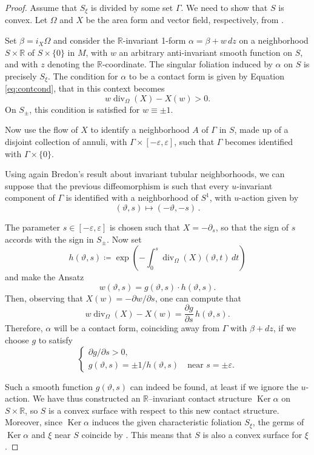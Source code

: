 \documentclass[a4paper, 11pt]{amsart}
\theoremstyle{plain}
\theoremstyle{definition}
\newcommand{\R}{\mathbb{R}}
\renewcommand{\epsilon}{\varepsilon}
\renewcommand{\theta}{\vartheta}
\DeclareMathOperator{\Ker}{Ker}
\DeclareMathOperator{\diver}{div}
\begin{document}
\begin{proof}
	Assume that $S_\xi$ is divided by some set $\Gamma$. We need to show that $S$ is convex. Let $\Omega$ and $X$ be the area form and vector field, respectively, from .
	
	Set $\beta = i_X\Omega$ and consider the $\R$-invariant 1-form $\alpha = \beta + w\,dz$ on a neighborhood $S \times \R$ of $S \times \{0\}$ in $M$, with $w$ an arbitrary anti-invariant smooth function on $S$, and with $z$ denoting the $\R$-coordinate. The singular foliation induced by $\alpha$ on $S$ is precisely $S_\xi$. The condition for $\alpha$ to be a contact form is given by Equation \eqref{eq:contcond}, that in this context becomes
	\[
	w \diver_\Omega(X) - X(w) > 0.
	\]
	On $S_\pm$, this condition is satisfied for $w \equiv \pm 1$.
	
	Now use the flow of $X$ to identify a neighborhood $A$ of $\Gamma$ in $S$, made up of a disjoint collection of annuli, with $\Gamma \times [-\epsilon, \epsilon]$, such that $\Gamma$ becomes identified with $\Gamma \times \{0\}$.
	
	Using again Bredon's result about invariant tubular neighborhoods, we can suppose that the previous diffeomorphism is such that every $u$-invariant component of $\Gamma$ is identified with a neighborhood of $S^1$, with $u$-action given by
	\[
		(\theta, s) \mapsto (-\theta,-s)\,.
	\]
	
	The parameter $s \in [-\epsilon, \epsilon]$ is chosen such that $X = -\partial_s$, so that the sign of $s$ accords with the sign in $S_\pm$. Now set
	\[
	h(\theta, s) \coloneqq \exp\left(-\int_0^{s} \diver_\Omega(X)(\theta, t)\,dt\right)
	\]
	and make the Ansatz
	\[
	w(\theta, s) = g(\theta, s) \cdot h(\theta, s).
	\]
	Then, observing that $X(w) = -\partial w/\partial s$, one can compute that
	\[
	w \diver_\Omega(X) - X(w) = \frac{\partial g}{\partial s}\,h(\theta, s).
	\]
	Therefore, $\alpha$ will be a contact form, coinciding away from $\Gamma$ with $\beta + dz$, if we choose $g$ to satisfy
	\begin{equation}\label{casesg}
	\begin{cases}
		\partial g/\partial s > 0, \\
		g(\theta, s) = \pm 1/h(\theta, s) \quad \text{near } s = \pm\epsilon.
	\end{cases}
	\end{equation}
	
	Such a smooth function $g(\theta,s)$ can indeed be found, at least if we ignore the $u$-action. We have thus constructed an $\R$–invariant contact structure $\Ker\alpha$ on $S\times \R$,	so $S$ is a convex surface with respect to this new contact structure. Moreover, since $\Ker\alpha$ induces the given characteristic foliation $S_\xi$, the germs of $\Ker\alpha$ and $\xi$ near $S$ coincide by . This means that $S$ is also a convex surface for $\xi$.
	

\end{proof}
\end{document}
